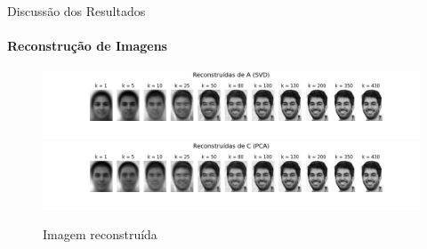 \documentclass[xcolor=dvipsnames,t,aspectratio=169]{beamer} %
\begin{document}
\begin{frame}[c]{Discussão dos Resultados}
\framesubtitle{Reconstrução de Imagens}

            \begin{figure}[H]
                  \centering
                  \includegraphics[width=1\textwidth]{img/reconstrucao_a.jpeg}
                  \includegraphics[width=1\textwidth]{img/reconstrucao_c.jpeg}
                  \caption{Imagem reconstruída}
                  \label{fig:exemplo}
        \end{figure}

\end{frame}
\end{document}
